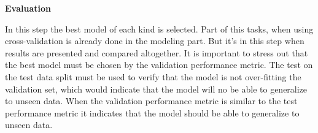 \textbf{Evaluation}

In this step the best model of each kind is selected. Part of this tasks, when using cross-validation is already done in the modeling part. But it's in this step when results are presented and compared altogether. 
It is important to stress out that the best model must be chosen by the validation performance metric. The test on the test data split must be used to verify that the model is not over-fitting the validation set, which would indicate that the model will no be able to generalize to unseen data. When the validation performance metric is similar to the test performance metric it indicates that the model should be able to generalize to unseen data.





